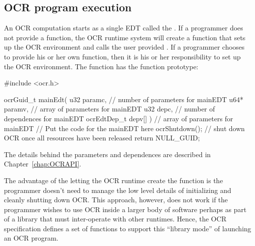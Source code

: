 %

\subsection{OCR program execution}
\label{sec:ProgExec}
An OCR computation starts as a single EDT called the .
If a programmer does not provide a  function, the OCR
runtime system will create a  function that sets up the
OCR environment and calls the user provided . If a
programmer chooses to provide his or her own  function,
then it is his or her responsibility to set up the OCR environment.
The  function has the function prototype:
\begin{ocrsnip}
#include <ocr.h>

ocrGuid_t mainEdt(
             u32 paramc,           // number of parameters for mainEDT
             u64* paramv,          // array of parameters for mainEDT
             u32 depc,             // number of dependences for mainEDT
             ocrEdtDep_t depv[] )  // array of parameters for mainEDT
{
    // Put the code for the mainEDT here
    ocrShutdown();         // shut down OCR once all resources have been released
    return NULL_GUID;
}
\end{ocrsnip}
The details behind the parameters and dependences are described in
Chapter~\ref{chap:OCRAPI}.

The advantage of the letting the OCR runtime create the 
function is the programmer doesn't need to manage the low level
details of initializing and cleanly shutting down OCR. This approach,
however, does not work if the programmer wishes to use OCR inside a
larger body of software perhaps as part of a library that must
inter-operate with other runtimes. Hence, the OCR specification
defines a set of functions to support this ``library mode'' of
launching an OCR program.

